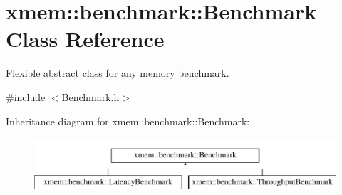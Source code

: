 \hypertarget{classxmem_1_1benchmark_1_1_benchmark}{}\section{xmem\+:\+:benchmark\+:\+:Benchmark Class Reference}
\label{classxmem_1_1benchmark_1_1_benchmark}


Flexible abstract class for any memory benchmark.  




{\ttfamily \#include $<$Benchmark.\+h$>$}

Inheritance diagram for xmem\+:\+:benchmark\+:\+:Benchmark\+:\begin{figure}[H]
\begin{center}
\leavevmode
\includegraphics[height=2.000000cm]{classxmem_1_1benchmark_1_1_benchmark}
\end{center}
\end{figure}
